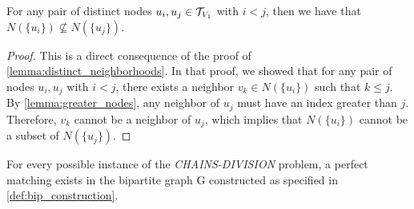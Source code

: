 \begin{claim} \label{claim:prev_not_subset}
    For any pair of distinct nodes $u_i, u_j \in \mathcal{T}_{V_1}$ with $i < j$, then we have that $N(\{u_i\}) \not\subseteq N(\{u_j\})$.
\end{claim}
\begin{proof}
    This is a direct consequence of the proof of \cref{lemma:distinct_neighborhoods}. In that proof, we showed that for any pair of nodes $u_i, u_j$ with $i < j$, there exists a neighbor $v_k \in N(\{u_i\})$ such that $k \leq j$. By \cref{lemma:greater_nodes}, any neighbor of $u_j$ must have an index greater than $j$. Therefore, $v_k$ cannot be a neighbor of $u_j$, which implies that $N(\{u_i\})$ cannot be a subset of $N(\{u_j\})$.
\end{proof}

\begin{lemma} \label{lemma:matching_existence}
    For every possible instance of the \textit{CHAINS-DIVISION} problem, a perfect matching exists in the bipartite graph G constructed as specified in \cref{def:bip_construction}.
\end{lemma}

